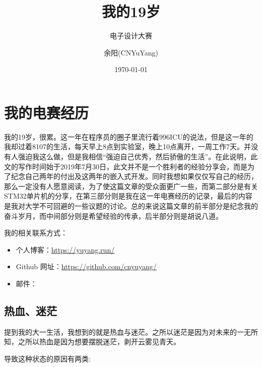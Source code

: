 \documentclass[cn,11pt]{elegantbook}
\title{我的19岁}
\subtitle{电子设计大赛}
\author{余阳(CNYuYang)}
\institute{武汉理工大学电子科技协会}
\date{\today}
\begin{document}
\maketitle
\tableofcontents


\mainmatter
\hypersetup{pageanchor=true}

\chapter{我的电赛经历}

我的19岁，很累。这一年在程序员的圈子里流行着996ICU的说法，但是这一年的我却过着8107的生活，每天早上8点到实验室，晚上10点离开，一周工作7天。并没有人强迫我这么做，但是我相信“强迫自己优秀，然后骄傲的生活”。在此说明，此文的写作时间始于2019年7月30日，此文并不是一个胜利者的经验分享会，而是为了纪念自己两年的付出及这两年的嵌入式开发。同时我想如果仅仅写自己的经历，那么一定没有人愿意阅读，为了使这篇文章的受众面更广一些，而第二部分是有关STM32单片机的分享，在第三部分则是我在这一年电赛经历的记录，最后的内容是我对大学不可回避的一些议题的讨论。总的来说这篇文章的前半部分是纪念我的奋斗岁月，而中间部分则是希望经验的传承，后半部分则是胡说八道。

我的相关联系方式：
\begin{itemize}
\item 个人博客：\href{https://yuyang.run/}{https://yuyang.run/}
\item Github 网址：\href{https://github.com/cnyuyang/}{https://github.com/cnyuyang/}
\item 邮件：
\end{itemize}

\section{热血、迷茫}

提到我的大一生活，我想到的就是热血与迷茫。之所以迷茫是因为对未来的一无所知，之所以热血是因为想要摆脱迷茫，剥开云雾见青天。

导致这种状态的原因有两类:
\end{document}
